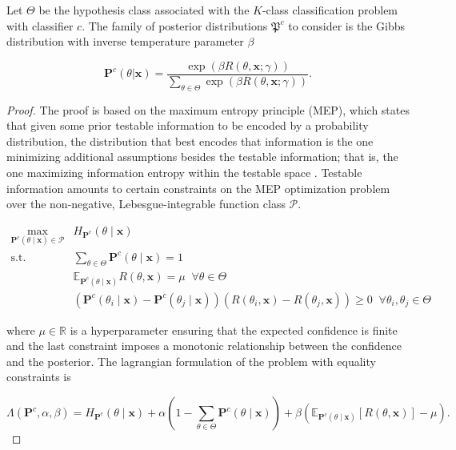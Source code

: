 \begin{theorem}
    Let $\Theta$ be the hypothesis class associated with the 
    $K$-class classification problem with classifier $c$.
    The family of posterior distributions $\mathfrak{P}^c$ to consider is the Gibbs
    distribution with inverse temperature parameter $\beta$
    \cite{buhmannPosteriorAgreementModel2022}

    $$
        \mathbf{P}^c (\theta | \bm{x}) = \frac{\exp \left ( \beta R(\theta, \bm{x}; \gamma) \right )}{\sum_{\theta \in \Theta} \exp \left ( \beta R(\theta, \bm{x}; \gamma) \right )}.
    $$
\end{theorem}

\begin{proof}
    The proof is based on the maximum entropy principle (MEP), which states that
    given some prior testable information to be encoded by a probability 
    distribution, the distribution that best encodes that information is the one
    minimizing additional assumptions besides the testable information; that is, the one
    maximizing information entropy within the testable space
    \cite{logicofscience}.
    Testable information amounts to certain constraints on
    the MEP optimization problem over the non-negative, Lebesgue-integrable function class $\mathcal{P}$.

    $$
    \begin{aligned}
        \underset{\mathbf{P}^c(\theta \mid \bm{x}) \in \mathcal{P}}{\operatorname{max}} & H_{\mathbf{P}^c}(\theta \mid \bm{x}) \\
        \text {s.t.} & \sum_{\theta \in \Theta} \mathbf{P}^c(\theta \mid \bm{x}) = 1 \\
        & \mathbb{E}_{\mathbf{P}^c(\theta \mid \bm{x})}R(\theta, \bm{x})=\mu \;\; \forall \theta \in \Theta \\
        & \left( \mathbf{P}^c(\theta_i \mid \bm{x}) - \mathbf{P}^c(\theta_j \mid \bm{x} ) \right) \left( R(\theta_i, \bm{x}) - R(\theta_j, \bm{x}) \right) \geq 0 \;\; \forall \theta_i, \theta_j \in \Theta
    \end{aligned}
    $$

    where $\mu \in \mathbb{R}$ is a hyperparameter ensuring that the expected confidence is finite
    and the last constraint imposes a monotonic relationship between the confidence and the posterior.
    The lagrangian formulation of the problem with equality constraints is

    $$
        \Lambda(\mathbf{P}^c, \alpha, \beta) = H_{\mathbf{P}^c}(\theta \mid \bm{x}) + \alpha \left ( 1 - \sum_{\theta \in \Theta} \mathbf{P}^c(\theta \mid \bm{x}) \right ) +
        \beta  \left ( \mathbb{E}_{\mathbf{P}^c(\theta \mid \bm{x})}[R(\theta, \bm{x})] - \mu \right ).
    $$


\end{proof}
